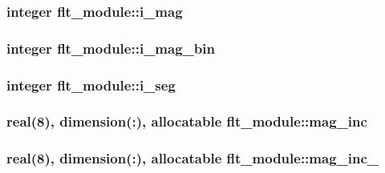 \subsubsection[{i\+\_\+mag}]{\setlength{\rightskip}{0pt plus 5cm}integer flt\+\_\+module\+::i\+\_\+mag}\label{namespaceflt__module_a5e6a726815330fe30804c2cfb77e2651}
\hypertarget{namespaceflt__module_a922b2ed6f3dff53fad4a824cde4270fd}{}
\subsubsection[{i\+\_\+mag\+\_\+bin}]{\setlength{\rightskip}{0pt plus 5cm}integer flt\+\_\+module\+::i\+\_\+mag\+\_\+bin}\label{namespaceflt__module_a922b2ed6f3dff53fad4a824cde4270fd}
\hypertarget{namespaceflt__module_a74639d2c8f137bceff8db7f162301d8c}{}
\subsubsection[{i\+\_\+seg}]{\setlength{\rightskip}{0pt plus 5cm}integer flt\+\_\+module\+::i\+\_\+seg}\label{namespaceflt__module_a74639d2c8f137bceff8db7f162301d8c}
\hypertarget{namespaceflt__module_af9892b4dca9fdd6644278654eb95f0d2}{}
\subsubsection[{mag\+\_\+inc}]{\setlength{\rightskip}{0pt plus 5cm}real(8), dimension(\+:), allocatable flt\+\_\+module\+::mag\+\_\+inc}\label{namespaceflt__module_af9892b4dca9fdd6644278654eb95f0d2}
\hypertarget{namespaceflt__module_a758f2d6ebaadfe7af02eddd7ab5e4bdd}{}
\subsubsection[{mag\+\_\+inc\+\_\+0}]{\setlength{\rightskip}{0pt plus 5cm}real(8), dimension(\+:), allocatable flt\+\_\+module\+::mag\+\_\+inc\+\_}\label{namespaceflt__module_a758f2d6ebaadfe7af02eddd7ab5e4bdd}
\hypertarget{namespaceflt__module_aa0b3754bd3b678669c3b99f861359208}{}
